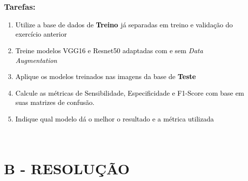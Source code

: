 \textcolor{black}{ }

\subsubsection*{Tarefas:}

\begin{enumerate}[series=listWWNumxxv,label=\alph*),ref=\alph*]
\item \textcolor{black}{Utilize a base de dados de }\textbf{\textcolor{black}{Treino }}\textcolor{black}{ já separadas em
treino e validação do exercício anterior}\textcolor{black}{ }
\item \textcolor{black}{Treine modelos VGG16 e Resnet50 adaptadas com e sem }\textit{\textcolor{black}{Data
Augmentation}}\textcolor{black}{ }
\item \textcolor{black}{Aplique os modelos treinados nas imagens da base de
}\textbf{\textcolor{black}{Teste}}\textcolor{black}{ }
\item \textcolor{black}{Calcule as métricas de Sensibilidade, Especificidade e F1-Score com base em suas matrizes de
confusão.}\textcolor{black}{ }
\item \textcolor{black}{Indique qual modelo dá o melhor o resultado e a métrica utilizada}\textcolor{black}{ }
\end{enumerate}
\textcolor{black}{ }

\section*{\textbf{B - RESOLUÇÃO}}
\lipsum[30]